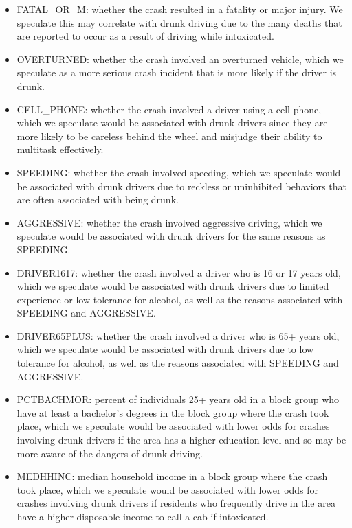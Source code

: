 \documentclass[
]{article}
\begin{document}
\begin{itemize}
\item
  FATAL\_OR\_M: whether the crash resulted in a fatality or major
  injury. We speculate this may correlate with drunk driving due to the
  many deaths that are reported to occur as a result of driving while
  intoxicated.
\item
  OVERTURNED: whether the crash involved an overturned vehicle, which we
  speculate as a more serious crash incident that is more likely if the
  driver is drunk.
\item
  CELL\_PHONE: whether the crash involved a driver using a cell phone,
  which we speculate would be associated with drunk drivers since they
  are more likely to be careless behind the wheel and misjudge their
  ability to multitask effectively.
\item
  SPEEDING: whether the crash involved speeding, which we speculate
  would be associated with drunk drivers due to reckless or uninhibited
  behaviors that are often associated with being drunk.
\item
  AGGRESSIVE: whether the crash involved aggressive driving, which we
  speculate would be associated with drunk drivers for the same reasons
  as SPEEDING.
\item
  DRIVER1617: whether the crash involved a driver who is 16 or 17 years
  old, which we speculate would be associated with drunk drivers due to
  limited experience or low tolerance for alcohol, as well as the
  reasons associated with SPEEDING and AGGRESSIVE.
\item
  DRIVER65PLUS: whether the crash involved a driver who is 65+ years
  old, which we speculate would be associated with drunk drivers due to
  low tolerance for alcohol, as well as the reasons associated with
  SPEEDING and AGGRESSIVE.
\item
  PCTBACHMOR: percent of individuals 25+ years old in a block group who
  have at least a bachelor's degrees in the block group where the crash
  took place, which we speculate would be associated with lower odds for
  crashes involving drunk drivers if the area has a higher education
  level and so may be more aware of the dangers of drunk driving.
\item
  MEDHHINC: median household income in a block group where the crash
  took place, which we speculate would be associated with lower odds for
  crashes involving drunk drivers if residents who frequently drive in
  the area have a higher disposable income to call a cab if intoxicated.
\end{itemize}
\end{document}
